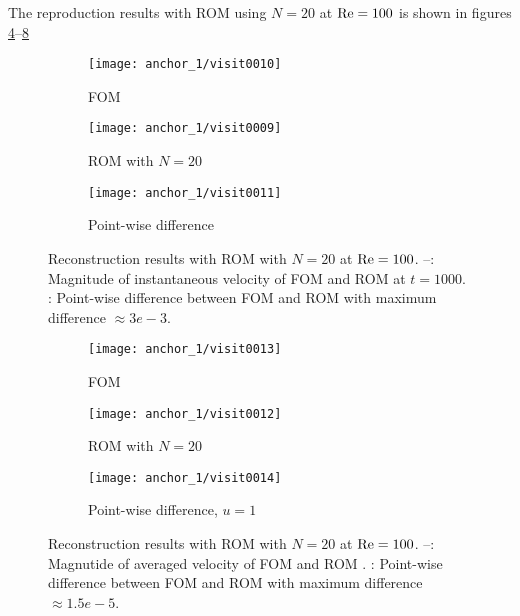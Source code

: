 The reproduction results with ROM using $N=20$ at $\rm Re=100$ is shown in figures \ref{fig:1}--\ref{fig:2}
\begin{figure}[h]
     \centering
     \begin{subfigure}[b]{0.3\textwidth}
         \centering
         \texttt{[image: anchor\_1/visit0010]}
         \caption{FOM}
         \label{fig:1_a}
     \end{subfigure}
     \hfill
     \begin{subfigure}[b]{0.3\textwidth}
         \centering
         \texttt{[image: anchor\_1/visit0009]}
         \caption{ROM with $N=20$}
         \label{fig:1_b}
     \end{subfigure}
     \hfill
     \begin{subfigure}[b]{0.3\textwidth}
         \centering
         \texttt{[image: anchor\_1/visit0011]}
         \caption{Point-wise difference}
         \label{fig:1_c}
     \end{subfigure}
     \caption{Reconstruction results with ROM with $N=20$ at $\rm Re=100$.
--: Magnitude of instantaneous velocity of FOM
and ROM at $t=1000$. : Point-wise difference between FOM and
ROM with maximum difference $\approx 3e-3$.}
      \label{fig:1}
\end{figure}
\begin{figure}[h]
     \centering
     \begin{subfigure}[b]{0.3\textwidth}
         \centering
         \texttt{[image: anchor\_1/visit0013]}
         \caption{FOM}
         \label{fig:2_a}
     \end{subfigure}
     \hfill
     \begin{subfigure}[b]{0.3\textwidth}
         \centering
         \texttt{[image: anchor\_1/visit0012]}
         \caption{ROM with $N=20$}
         \label{fig:2_b}
     \end{subfigure}
     \hfill
     \begin{subfigure}[b]{0.3\textwidth}
         \centering
         \texttt{[image: anchor\_1/visit0014]}
         \caption{Point-wise difference, $u=1$}
         \label{fig:2_c}
     \end{subfigure} 
     \caption{Reconstruction results with ROM with $N=20$ at $\rm Re=100$.
     --: Magnutide of averaged velocity of FOM
and ROM .  : Point-wise difference between FOM and ROM with
maximum difference $\approx 1.5e-5$.}
     \label{fig:2}
\end{figure}

